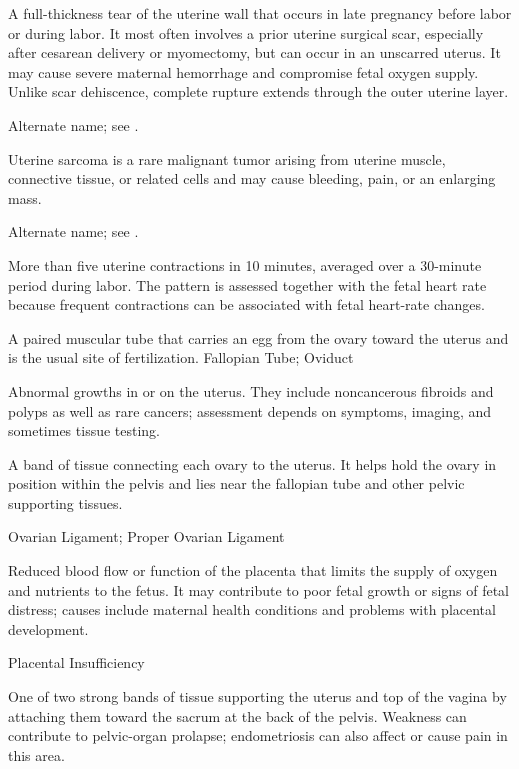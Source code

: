  A full-thickness tear of the uterine wall that occurs in
late pregnancy before labor or during labor. It most often involves a prior uterine
surgical scar, especially after cesarean delivery or myomectomy, but can occur in an
unscarred uterus. It may cause severe maternal hemorrhage and compromise fetal oxygen
supply. Unlike scar dehiscence, complete rupture extends through the outer uterine layer.

 Alternate name; see .

 Uterine sarcoma is a rare malignant tumor arising from uterine muscle, connective tissue, or related cells and may cause bleeding, pain, or an enlarging mass.

 Alternate name; see .

 More than five uterine contractions in 10 minutes, averaged over a 30-minute period during labor. The pattern is assessed together with the fetal heart rate because frequent contractions can be associated with fetal heart-rate changes.

 A paired muscular tube that carries an egg from the ovary toward the uterus and is the usual site of fertilization.
\synonyms
Fallopian Tube; Oviduct

 Abnormal growths in or on the uterus. They include noncancerous fibroids and polyps as well as rare cancers; assessment depends on symptoms, imaging, and sometimes tissue testing.

 A band of tissue connecting each ovary to the uterus. It helps hold the ovary in position within the pelvis and lies near the fallopian tube and other pelvic supporting tissues.

\synonyms
Ovarian Ligament; Proper Ovarian Ligament

 Reduced blood flow or function of the placenta that limits the supply of oxygen and nutrients to the fetus. It may contribute to poor fetal growth or signs of fetal distress; causes include maternal health conditions and problems with placental development.

\synonyms
Placental Insufficiency

 One of two strong bands of tissue supporting the uterus and top of the vagina by attaching them toward the sacrum at the back of the pelvis. Weakness can contribute to pelvic-organ prolapse; endometriosis can also affect or cause pain in this area.

